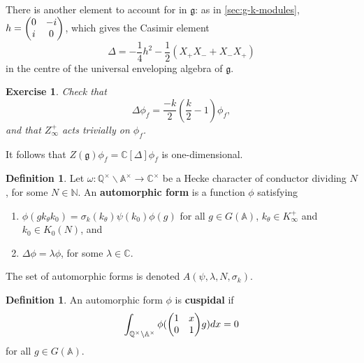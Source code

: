 \documentclass[11pt]{report}
\let\mbb\mathbb
\let\mf\mathfrak
\newcommand{\1}{\mathbbm 1}
\newcommand{\N}{\mathbb{N}}
\newcommand{\Q}{\mathbb{Q}}
\newcommand{\C}{\mathbb{C}}
\newcommand{\A}{\mbb A}
\newcommand{\bs}{\backslash}
\theoremstyle{plain}
\newcounter{ex}
\newtheorem{exercise}[ex]{Exercise}
\theoremstyle{definition}
\newtheorem{mydef}[thm]{Definition}
\theoremstyle{remark}
\numberwithin{equation}{section}
\begin{document}
There is another element to account for in $\mf g$: as in \cref{sec:g-k-modules},
$h = \mqty(0 & -i \\ i & 0)$, which gives the Casimir element
\begin{equation}
  \label{eq:19}
\Delta = - \frac{1}{4}h^{2} - \frac{1}{2}(X_{+}X_{-} + X_{-}X_{+})
\end{equation}
in the centre of the universal enveloping algebra of $\mf g$. 
\begin{exercise}
  Check that
  \begin{equation}
    \label{eq:29}
\Delta \phi_{f} = \frac{-k}{2} (\frac{k}{2}-1)\phi_{f},
\end{equation}
and that $Z_{\infty}^{+}$ acts trivially on $\phi_{f}$. 
\end{exercise}

It follows that $Z(\mf g)\phi_{f} = \C[\Delta]\phi_{f}$ is one-dimensional. 

\begin{mydef}
  Let $\omega : \Q^{\times} \bs \A^{\times}\to \C^{\times} $ be a Hecke character of
  conductor dividing $N$, for some $N \in \N$. An
  \textbf{automorphic form} is a function $\phi$ satisfying
\begin{enumerate}
\item $\phi(gk_{\theta}k_{0}) = \sigma_{k}(k_{\theta})\psi(k_{0})\phi(g)$ for all $g \in G(\A)$,
  $k_{\theta} \in K_{\infty}^{+}$ and $k_{0} \in K_{0}(N)$, and
\item $\Delta\phi = \lambda \phi$, for some $\lambda \in \C$. 
\end{enumerate}

The set of automorphic forms is denoted
$A(\psi,\lambda,N,\sigma_{k})$.

\end{mydef}
\begin{mydef}
  An automorphic form $\phi$ is \textbf{cuspidal} if
  \begin{equation}
    \label{eq:35}
    \int_{\Q^{\times}\bs \A^{\times}} \phi(\mqty(1  & x \\ 0 & 1)g)dx = 0 
  \end{equation}
for all $g \in G(\A)$. 
\end{mydef}
\end{document}

